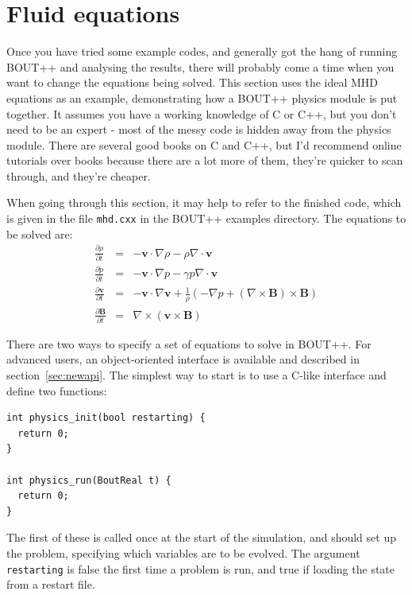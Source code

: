 \documentclass[12pt]{article}
\newcommand{\code}[1]{\texttt{#1}}
\newcommand{\deriv}[2]{\ensuremath{\frac{\partial #1}{\partial #2}}}
\begin{document}
\section{Fluid equations}
\label{sec:equations}

Once you have tried some example codes, and generally got the hang of running
BOUT++ and analysing the results, there will probably come a time when
you want to change the equations being solved. 
This section uses the ideal MHD equations as an example, demonstrating how
a BOUT++ physics module is put together. It assumes you have a working knowledge
of C or C++, but you don't need to be an expert - most of the messy code is hidden away
from the physics module. There are several good books on C and C++, but I'd recommend online
tutorials over books because there are a lot more of them, they're quicker to scan through,
and they're cheaper.

When going through this section, it may help to refer to the finished code, which
is given in the file \texttt{mhd.cxx} in the BOUT++ examples directory. The equations to be solved are:
\begin{eqnarray*}
\deriv{\rho}{t} &=& -\mathbf{v}\cdot\nabla\rho - \rho\nabla\cdot\mathbf{v} \\
\deriv{p}{t} &=& -\mathbf{v}\cdot\nabla p - \gamma p\nabla\cdot\mathbf{v} \\
\deriv{\mathbf{v}}{t} &=& -\mathbf{v}\cdot\nabla\mathbf{v} + \frac{1}{\rho}\left(-\nabla p + \left(\nabla\times\mathbf{B}\right)\times\mathbf{B}\right) \\
\deriv{\mathbf{B}}{t} &=& \nabla\times\left(\mathbf{v}\times\mathbf{B}\right)
\end{eqnarray*}

There are two ways to specify a set of equations to solve in BOUT++. For advanced users, an object-oriented interface is available and described in section~\ref{sec:newapi}. The simplest way to start is to
use a C-like interface and define two functions:
\begin{lstlisting}
int physics_init(bool restarting) {
  return 0;
}

int physics_run(BoutReal t) {
  return 0;
}
\end{lstlisting}
The first of these is called once at the start of the simulation, and should set up the problem,
specifying which variables are to be evolved. The argument \code{restarting} is false the first time a problem is run, and true if loading the state from a
restart file.
\end{document}
